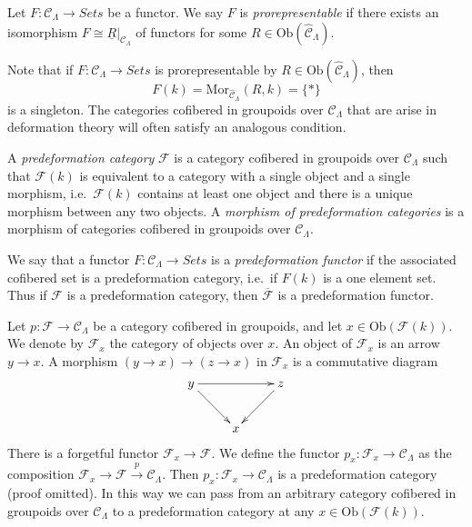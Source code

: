 \begin{definition}
\label{definition-prorepresentable}
Let $F : \mathcal{C}_\Lambda \to \textit{Sets}$ be a functor.
We say $F$ is {\it prorepresentable} if there exists an isomorphism
$F \cong \underline{R}|_{\mathcal{C}_\Lambda}$ of functors for some
$R \in \text{Ob}(\widehat{\mathcal{C}}_\Lambda)$.
\end{definition}  

\noindent
Note that if $F : \mathcal{C}_\Lambda \to \textit{Sets}$ is prorepresentable
by $R \in \text{Ob}(\widehat{\mathcal{C}}_\Lambda)$, then
$$
F(k) = \text{Mor}_{\widehat{\mathcal{C}}_\Lambda}(R, k) = \{*\}
$$
is a singleton. The categories cofibered in groupoids over
$\mathcal{C}_\Lambda$ that are arise in deformation theory will often satisfy
an analogous condition.

\begin{definition}
\label{definition-predeformation-category}
A {\it predeformation category} $\mathcal{F}$ is a category cofibered
in groupoids over $\mathcal{C}_\Lambda$ such that $\mathcal{F}(k)$ is
equivalent to a category with a single object and a single morphism,
i.e.\ $\mathcal{F}(k)$ contains at least one object and there is a
unique morphism between any two objects. A {\it morphism of predeformation
categories} is a morphism of categories cofibered in groupoids over
$\mathcal{C}_\Lambda$.
\end{definition}

\begin{remark}
\label{remark-predeformation-functor}
We say that a functor $F: \mathcal{C}_\Lambda \to \textit{Sets}$ 
is a {\it predeformation functor} if the associated cofibered set is a 
predeformation category, i.e.\ if $F(k)$ is a one element set.  Thus if 
$\mathcal{F}$ is a predeformation category, then $\overline{\mathcal{F}}$ is a 
predeformation functor.
\end{remark}

\begin{remark}
\label{remark-localize-cofibered-groupoid} 
Let $p: \mathcal{F} \to \mathcal{C}_\Lambda$ be a category cofibered in 
groupoids, and let $x \in \text{Ob}(\mathcal{F}(k))$.  We denote by 
$\mathcal{F}_{x}$ the category of objects over $x$.
An object of $\mathcal{F}_x$ is an arrow $y \to x$.
A morphism $(y \to x) \to (z \to x)$ in $\mathcal{F}_x$ is a commutative 
diagram
$$
\xymatrix{
y \ar[rr] \ar[dr] & & z \ar[dl] \\
& x &
}
$$
There is a forgetful functor $\mathcal{F}_{x} \to \mathcal{F}$. We define 
the functor $p_x : \mathcal{F}_{x} \to \mathcal{C}_\Lambda$ as the 
composition
$\mathcal{F}_x \to \mathcal{F} \xrightarrow{p} \mathcal{C}_\Lambda$.
Then $p_x : \mathcal{F}_x \to \mathcal{C}_\Lambda$ is a 
predeformation category (proof omitted). In this way we can pass from an
arbitrary category cofibered in groupoids over $\mathcal{C}_\Lambda$
to a predeformation category at any $x \in \text{Ob}(\mathcal{F}(k))$.
\end{remark}






